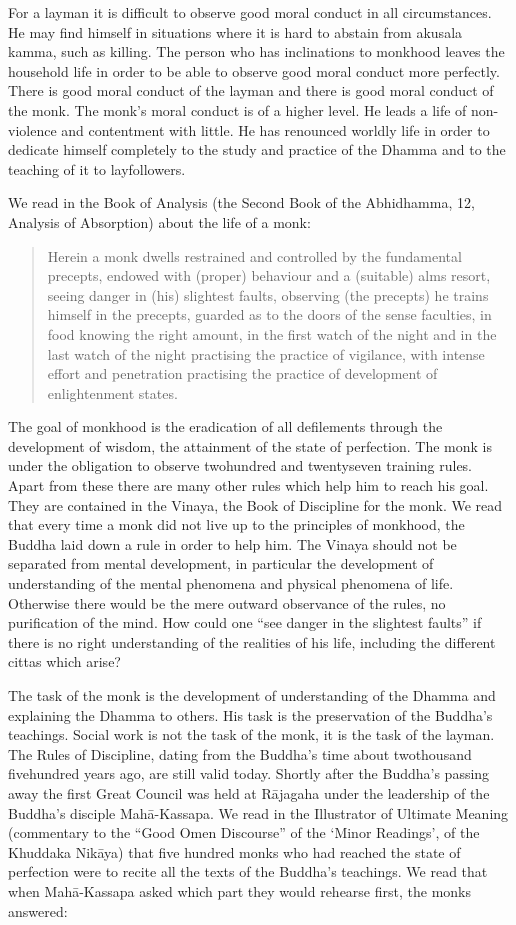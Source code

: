 \documentclass{book}
\begin{document}
For a layman it is difficult to observe good moral conduct in all
circumstances. He may find himself in situations where it is hard to
abstain from akusala kamma, such as killing. The person who has
inclinations to monkhood leaves the household life in order to be able
to observe good moral conduct more perfectly. There is good moral
conduct of the layman and there is good moral conduct of the monk. The
monk's moral conduct is of a higher level. He leads a life of
non-violence and contentment with little. He has renounced worldly life
in order to dedicate himself completely to the study and practice of the
Dhamma and to the teaching of it to layfollowers.

We read in the Book of Analysis (the Second Book of the Abhidhamma, 12,
Analysis of Absorption) about the life of a monk:

\begin{quote}
Herein a monk dwells restrained and controlled by the fundamental
precepts, endowed with (proper) behaviour and a (suitable) alms resort,
seeing danger in (his) slightest faults, observing (the precepts) he
trains himself in the precepts, guarded as to the doors of the sense
faculties, in food knowing the right amount, in the first watch of the
night and in the last watch of the night practising the practice of
vigilance, with intense effort and penetration practising the practice
of development of enlightenment states.
\end{quote}

The goal of monkhood is the eradication of all defile­ments through the
development of wisdom, the attainment of the state of perfection. The
monk is under the obligation to observe twohundred and twentyseven
training rules. Apart from these there are many other rules which help
him to reach his goal. They are contained in the Vinaya, the Book of
Discipline for the monk. We read that every time a monk did not live up
to the principles of monkhood, the Buddha laid down a rule in order to
help him. The Vinaya should not be separated from mental development, in
particular the development of understanding of the mental phenomena and
physical phenomena of life. Otherwise there would be the mere outward
observance of the rules, no purification of the mind. How could one
``see danger in the slightest faults'' if there is no right
understanding of the realities of his life, including the different
cittas which arise?

The task of the monk is the development of under­standing of the Dhamma
and explaining the Dhamma to others. His task is the preservation of the
Buddha's teachings. Social work is not the task of the monk, it is the
task of the layman. The Rules of Discipline, dating from the Buddha's
time about twothousand fivehundred years ago, are still valid today.
Shortly after the Buddha's passing away the first Great Council was held
at Rājagaha under the leadership of the Buddha's disciple Mahā-Kassapa.
We read in the Illustrator of Ultimate Meaning (commentary to the ``Good
Omen Discourse'' of the `Minor Readings', of the Khuddaka Nikāya) that
five hundred monks who had reached the state of perfection were to
recite all the texts of the Buddha's teachings. We read that when
Mahā-Kassapa asked which part they would rehearse first, the monks
answered:
\end{document}
